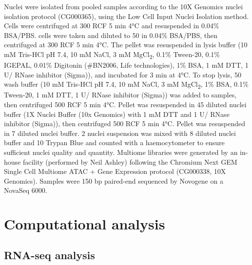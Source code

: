 Nuclei were isolated from pooled samples according to the 10X Genomics nuclei isolation protocol (CG000365), using the Low Cell Input Nuclei Isolation method. Cells were centrifuged at 300 RCF 5 min 4°C and resuspended in 0.04\% BSA/PBS.  cells were taken and diluted to 50 \microl{} in 0.04\% BSA/PBS, then centrifuged at 300 RCF 5 min 4°C. The pellet was resuspended in lysis buffer (10 mM Tris-HCl pH 7.4, 10 mM NaCl, 3 mM MgCl\textsubscript{2}, 0.1\% Tween-20, 0.1\% IGEPAL, 0.01\% Digitonin (\#BN2006, Life technologies), 1\% BSA, 1 mM DTT, 1 U/\microl{} RNase inhibitor (Sigma)), and incubated for 3 min at 4°C. To stop lysis, 50 \microl{} wash buffer (10 mM Tris-HCl pH 7.4, 10 mM NaCl, 3 mM MgCl\textsubscript{2}, 1\% BSA, 0.1\% Tween-20, 1 mM DTT, 1 U/\microl{} RNase inhibitor (Sigma)) was added to samples, then centrifuged 500 RCF 5 min 4°C. Pellet was resuspended in 45 \microl{} diluted nuclei buffer (1X Nuclei Buffer (10x Genomics) with 1 mM DTT and 1 U/\microl{} RNase inhibitor (Sigma)), then centrifuged 500 RCF 5 min 4°C. Pellet was resuspended in 7 \microl{} diluted nuclei buffer. 2 \microl{} nuclei suspension was mixed with 8 \microl{} diluted nuclei buffer and 10 \microl{} Trypan Blue and counted with a haemocytometer to ensure sufficient nuclei quality and quantity. Multiome libraries were generated by an in-house facility (performed by Neil Ashley) following the Chromium Next GEM Single Cell Multiome ATAC + Gene Expression protocol (CG000338, 10X Genomics). Samples were 150 bp paired-end sequenced by Novogene on a NovaSeq 6000.

\section{Computational analysis}

\subsection{\label{ch2:rna-analysis}RNA-seq analysis}

